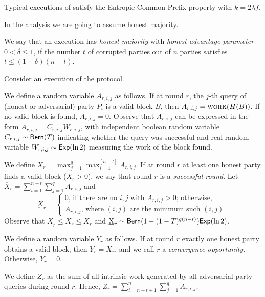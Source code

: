 \begin{theorem} 
  Typical executions of \poem satisfy the Entropic Common Prefix property
  with $k = 2 \lambda f$.
\end{theorem}

In the analysis we are going to assume honest majority.

\begin{definition}
  We say that an execution has \emph{honest majority} with \emph{honest advantage parameter}
  $0 < \delta \leq 1$, if the number $t$ of corrupted parties out of
  $n$ parties satisfies $t \leq (1 - \delta) (n - t)$.
\end{definition}


Consider an execution of the \poem protocol.

We define a random variable $A_{r, i, j}$ as follows.
If at round $r$, the $j$-th query of (honest or adversarial) party $P_i$ is a valid block $B$,
then $A_{r, i, j} = \textsc{work}(H(B))$.
If no valid block is found, $A_{r, i, j} = 0$.
Observe that $A_{r, i, j}$ can be expressed in the form $A_{r, i, j} = C_{r, i, j} W_{r, i, j}$,
with independent boolean random variable $C_{r, i, j} \sim \textsf{Bern}(T)$ indicating whether the query was successful
and real random variable $W_{r, i, j} \sim \textsf{Exp}(\ln2)$ measuring the work of the block found.

We define $X_{r} = \max_{j=1}^q \max_{i = 1}^{[n - t]} A_{r, i, j}$.
If at round $r$ at least one honest party finds a valid block ($X_r > 0$),
we say that round $r$ is a \emph{successful round}.
Let $\overline{X}_r = \sum_{i = 1}^{n - t} \sum_{j = 1}^q A_{r,i,j}$ and
\[
  \underbar{X}_r = \begin{cases}
  0 \text{, if there are no $i, j$ with $A_{r,i,j} > 0$; otherwise,}\\
  A_{r,i,j} \text{, where $(i, j)$ are the minimum such $(i, j)$.}
\end{cases}\]
Observe that $\underbar{X}_r \leq X_r \leq \overline{X}_r$
and $\underbar{X}_r \sim \textsf{Bern}(1 - (1 - T)^{q(n - t)}) \textsf{Exp}(\ln 2)$.

We define a random variable $Y_r$ as follows.
If at round $r$ exactly one honest party obtains a valid block, then $Y_r = X_r$,
and we call $r$ a \emph{convergence opportunity}. Otherwise, $Y_r = 0$.

We define $Z_{r}$ as the sum of all intrinsic work generated by all adversarial
party queries during round $r$. Hence, $Z_{r} = \sum_{i = n - t + 1}^n \sum_{j = 1}^q A_{r, i, j}$.


